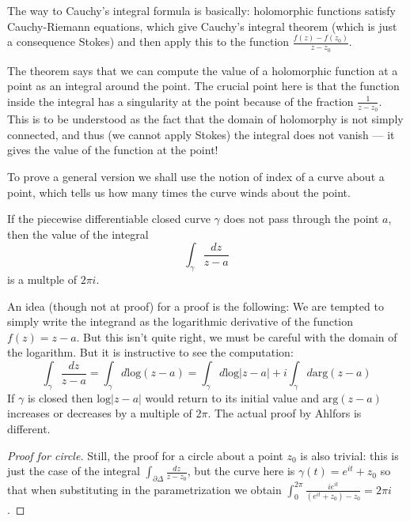 \noindent
The way to Cauchy's integral formula is basically:
holomorphic functions satisfy Cauchy-Riemann equations,
which give Cauchy's integral theorem 
(which is just a consequence Stokes)
and then apply this to the function $\frac{f(z)-f(z_0)}{z-z_0}$.

The theorem says that we can compute the value of
a holomorphic function at a point as an integral around the point.
The crucial point here is that the function inside the integral
has a singularity at the point because of the fraction $\frac{1}{z-z_0}$.
This is to be understood as the fact
that the domain of holomorphy is not simply connected, and thus
(we cannot apply Stokes) the integral does not vanish --- 
it gives the value of the function at the point!

To prove a general version we shall use the notion of index of a curve
about a point, which tells us how many times the curve winds about the point.

\begin{lemma}
\label{lemma-index-is-multiple-of-2pii}
\begin{reference}
\cite[Section 2.2, Lemma 1]{ahl}
\end{reference}
If the piecewise differentiable closed curve $\gamma$ does not pass through the
point $a$, then the value of the integral
$$
\int_\gamma\frac{dz}{z-a}
$$
is a multple of $2\pi i$.
\end{lemma}

An idea (though not at proof) for a proof is the following:
We are tempted to simply write the integrand as the logarithmic derivative of
the function $f(z)=z-a$. But this isn't quite right, we must be careful with the
domain of the logarithm. But it is instructive to see the computation:
$$
\int_\gamma\frac{dz}{z-a}=\int_\gamma d \text{log}(z-a)=
\int_\gamma d\text{log}|z-a|+i\int_\gamma d \text{arg}(z-a)
$$
If  $\gamma$ is closed then $\text{log}|z-a|$ would return to its initial value
and $\text{arg}(z-a)$ increases or decreases by a multiple of $2\pi$. The actual
proof by Ahlfors is different.

\begin{proof}[Proof for circle]
Still, the proof for a circle about a point $z_0$ is also trivial: this is just
the case of the integral $\int_{\partial\Delta}\frac{dz}{z-z_0}$, but the curve
here is  $\gamma(t)=e^{it}+z_0$ so that when substituting in the parametrization
we obtain $\int_0^{2\pi}\frac{ie^{it}}{(e^{it}+z_0)-z_0}=2\pi i$.
\end{proof}

